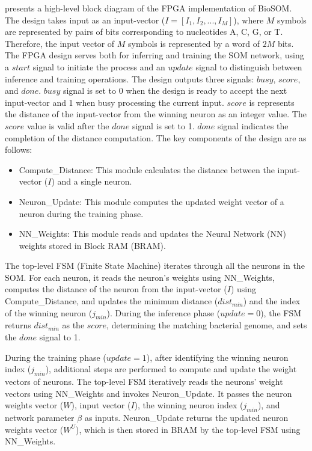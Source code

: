  presents a high-level block diagram of the FPGA implementation of BioSOM. The design takes input as an input-vector ($I = [I_1, I_2, ..., I_M]$), where $M$ symbols are represented by pairs of bits corresponding to nucleotides A, C, G, or T. Therefore, the input vector of $M$ symbols is represented by a word of $2M$ bits. The FPGA design serves both for inferring and training the SOM network, using a $start$ signal to initiate the process and an $update$ signal to distinguish between inference and training operations. The design outputs three signals: $busy$, $score$, and $done$.
$busy$ signal is set to 0 when the design is ready to accept the next input-vector and 1 when busy processing the current input. $score$ is represents the distance of the input-vector from the winning neuron as an integer value. The $score$ value is valid after the $done$ signal is set to 1. $done$ signal indicates the completion of the distance computation. The key components of the design are as follows:
\begin{itemize}
	\item Compute\_Distance: This module calculates the distance between the input-vector ($I$) and a single neuron.
	\item Neuron\_Update: This module computes the updated weight vector of a neuron during the training phase.
	\item NN\_Weights: This module reads and updates the Neural Network (NN) weights stored in Block RAM (BRAM).
\end{itemize}
The top-level FSM (Finite State Machine) iterates through all the neurons in the SOM. For each neuron, it reads the neuron's weights using NN\_Weights, computes the distance of the neuron from the input-vector ($I$) using Compute\_Distance, and updates the minimum distance ($dist_{min}$) and the index of the winning neuron ($j_{min}$). During the inference phase ($update{=}0$), the FSM returns $dist_{min}$ as the $score$, determining the matching bacterial genome, and sets the $done$ signal to 1.

During the training phase ($update{=}1$), after identifying the winning neuron index ($j_{min}$), additional steps are performed to compute and update the weight vectors of neurons. The top-level FSM iteratively reads the neurons' weight vectors using NN\_Weights and invokes Neuron\_Update. It passes the neuron weights vector ($W$), input vector ($I$), the winning neuron index ($j_{min}$), and network parameter $\beta$ as inputs. Neuron\_Update returns the updated neuron weights vector ($W^U$), which is then stored in BRAM by the top-level FSM using NN\_Weights.

